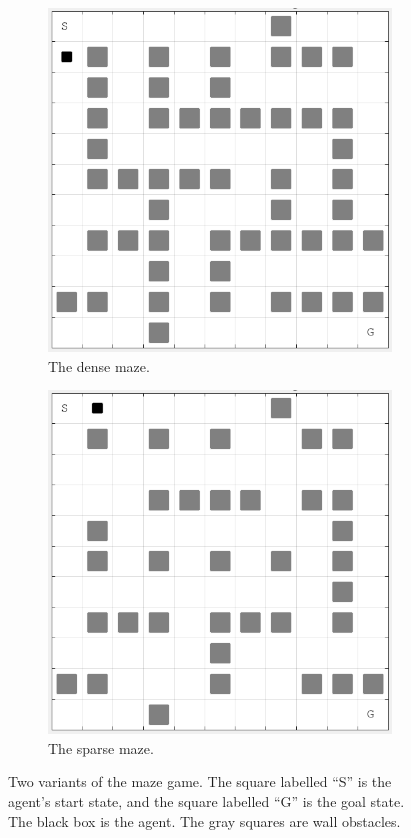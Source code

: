 \documentclass[notitlepage]{article}
\begin{document}
\begin{figure}
\centering
\begin{subfigure}{.4\textwidth}
  \centering
  \includegraphics[width=.95\linewidth]{dense_maze}
  \caption{The dense maze.}
\end{subfigure}
\begin{subfigure}{.4\textwidth}
  \centering
  \includegraphics[width=.95\linewidth]{sparse_maze}
  \caption{The sparse maze.}
\end{subfigure}
\caption{Two variants of the maze game. The square labelled ``S'' is the agent's start state, and the square labelled ``G'' is the goal state. The black box is the agent. The gray squares are wall obstacles.}
\label{fig:mazes}
\end{figure}
\end{document}
